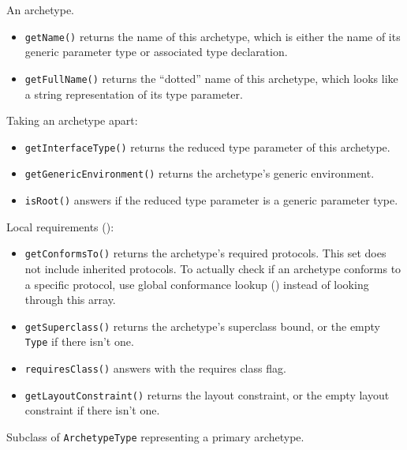 \documentclass[../generics]{subfiles}
\begin{document}
An archetype.
\begin{itemize}
\item \texttt{getName()} returns the name of this archetype, which is either the name of its generic parameter type or associated type declaration.
\item \texttt{getFullName()} returns the ``dotted'' name of this archetype, which looks like a string representation of its type parameter.
\end{itemize}
Taking an archetype apart:
\begin{itemize}
\item \texttt{getInterfaceType()} returns the reduced type parameter of this archetype.
\item \texttt{getGenericEnvironment()} returns the archetype's generic environment.
\item \texttt{isRoot()} answers if the reduced type parameter is a generic parameter type.
\end{itemize}
Local requirements ():
\begin{itemize}
\item \texttt{getConformsTo()} returns the archetype's required protocols. This set does not include inherited protocols. To actually check if an archetype conforms to a specific protocol, use global conformance lookup () instead of looking through this array.
\item \texttt{getSuperclass()} returns the archetype's superclass bound, or the empty \texttt{Type} if there isn't one.
\item \texttt{requiresClass()} answers with the requires class flag.
\item \texttt{getLayoutConstraint()} returns the layout constraint, or the empty layout constraint if there isn't one.
\end{itemize}

Subclass of \texttt{ArchetypeType} representing a primary archetype.
\end{document}

